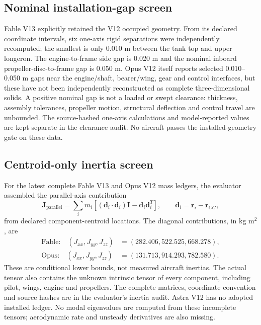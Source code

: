 \documentclass[11pt,a4paper]{article}
\begin{document}
\subsection{Nominal installation-gap screen}
Fable V13 explicitly retained the V12 occupied geometry. From its declared
coordinate intervals, six one-axis rigid separations were independently
recomputed; the smallest is only 0.010 m between the tank top and upper
longeron. The engine-to-frame side gap is 0.020 m and the nominal inboard
propeller-disc-to-frame gap is 0.050 m. Opus V12 itself reports selected
0.010--0.050 m gaps near the engine/shaft, bearer/wing, gear and control
interfaces, but these have not been independently reconstructed as complete
three-dimensional solids. A positive nominal gap is not a loaded or swept
clearance: thickness, assembly tolerances, propeller motion, structural
deflection and control travel are unbounded. The source-hashed one-axis
calculations and model-reported values are kept separate in the clearance
audit. No aircraft passes the installed-geometry gate on these data.

\subsection{Centroid-only inertia screen}
For the latest complete Fable V13 and Opus V12 mass ledgers, the evaluator
assembled the parallel-axis contribution
\begin{equation}\label{eq:parallelaxis}
\mathbf J_{\mathrm{parallel}}=\sum_i m_i
\left[(\mathbf d_i\cdot\mathbf d_i)\mathbf I-\mathbf d_i\mathbf d_i^T\right],
\qquad \mathbf d_i=\mathbf r_i-\mathbf r_{CG},
\end{equation}
from declared component-centroid locations. The diagonal contributions, in kg m$^2$, are
\begin{align*}
\text{Fable:}\quad (J_{xx},J_{yy},J_{zz})&=(282.406,522.525,668.278),\\
\text{Opus:}\quad (J_{xx},J_{yy},J_{zz})&=(131.713,914.293,782.580).
\end{align*} These are conditional
lower bounds, not measured aircraft inertias. The actual tensor also contains
the unknown intrinsic tensor of every component, including pilot, wings,
engine and propellers. The complete matrices, coordinate convention and
source hashes are in the evaluator's inertia audit. Astra V12 has no adopted
installed ledger. No modal eigenvalues are computed from these incomplete
tensors; aerodynamic rate and unsteady derivatives are also missing.
\end{document}
